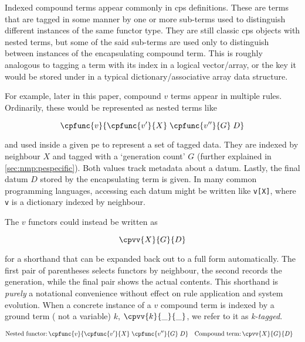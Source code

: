 Indexed compound terms appear commonly in \gls{cps} definitions.  These are terms that are tagged in some manner by one or more sub-terms used to distinguish different instances of the same functor type.  They are still classic \gls{cps} objects with nested terms, but some of the said sub-terms are used only to distinguish between instances of the encapsulating compound term.  This is roughly analogous to tagging a term with its index in a logical vector/array, or the key it would be stored under in a typical dictionary/associative array data structure.

For example, later in this paper, compound \(v\) terms appear in multiple rules.  Ordinarily, these would be represented as nested terms like 
\begin{framed}
\vspace{-1.0cm}
\[ \cpfunc{v}{\cpfunc{v'}{X} \; \cpfunc{v''}{G}\; D} \]
\vspace{-0.7cm}
\end{framed}\noindent
and used inside a given \gls{pe} to represent a set of tagged data.  They are indexed by neighbour \(X\) and tagged with a `generation count' \(G\) (further explained in \cref{sec:nmp:pespecific}).  Both values track metadata about a datum.  Lastly, the final datum \(D\) stored by the encapsulating term is given.  In many common programming languages, accessing each datum might be written like \texttt{v[X]}, where \texttt{v} is a dictionary indexed by neighbour.

The \(v\) functors could instead be written as
\begin{framed}
\vspace{-1.0cm}
\[ \cpvv{X}{G}{D} \]
\vspace{-0.7cm}
\end{framed}\noindent
for a shorthand that can be expanded back out to a full form automatically.  The first pair of parentheses selects functors by neighbour, the second records the generation, while the final pair shows the actual contents.  This shorthand is \emph{purely} a notational convenience without effect on rule application and system evolution.  When a concrete instance of a \(v\) compound term is indexed by a ground term (\ie{} not a variable) \(k\), \eg{} \(\cpvv{k}{\_}{\_}\), we refer to it as \emph{k-tagged}.

\begin{framed}
\vspace{-1.1cm}
    \begin{align*}
        \text{Nested functor:}&\, \cpfunc{v}{\cpfunc{v'}{X} \; \cpfunc{v''}{G}\; D} & \text{Compound term:}&\, \cpvv{X}{G}{D}
    \end{align*}
\vspace{-0.8cm}
\end{framed}

